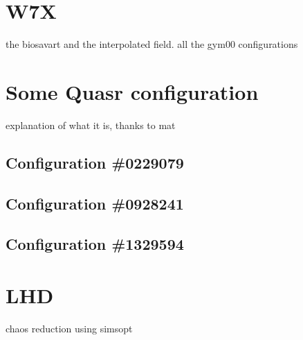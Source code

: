 
\chapter{W7X}
the biosavart and the interpolated field. all the gym00 configurations

\chapter{Some Quasr configuration}
explanation of what it is, thanks to mat
\section{Configuration \#0229079}
\section{Configuration \#0928241}
\section{Configuration \#1329594}

\chapter{LHD}
chaos reduction using simsopt

